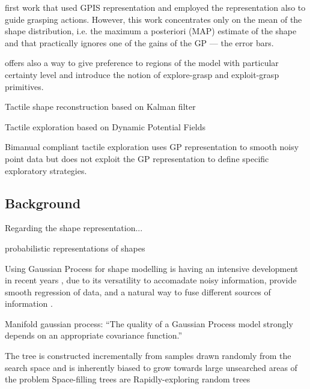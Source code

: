 \cite{Dragiev2011Gaussian} first work that used GPIS representation and employed the representation also to guide grasping actions. However, this work concentrates only on the mean of the shape distribution, i.e. the maximum a posteriori (MAP) estimate of the shape and that practically ignores one of the gains of the GP --- the error bars.

\cite{Dragiev2013Uncertainty} offers also a way to give preference to regions of the model with particular certainty level and introduce the notion of explore-grasp and exploit-grasp primitives.

{\color{red} Tactile shape reconstruction based on Kalman filter}
\citet{Meier2011Probabilistic}

{\color{red} Tactile exploration based on Dynamic Potential Fields}
\citet{Bierbaum2008Potential}

{\color{red} Bimanual compliant tactile exploration}
\citet{Sommer2014Bimanual} uses GP representation to smooth noisy point data but does not exploit the GP representation to define specific exploratory strategies.

\subsection{Background}
\label{sec:background}


Regarding the shape representation...

\citet{Faria2010Probabilistic} probabilistic representations of shapes

Using Gaussian Process for shape modelling is having an intensive development in recent years \citep{Mahler2015Grasp,Rosales2014Active,Bjorkman2013Enhancing,Dragiev2011Gaussian}, due to its versatility to accomadate noisy information, provide smooth regression of data, and a natural way to fuse different sources of information \citep{Rasmussen2006Gaussian}.

Manifold gaussian process: \citet{Calandra2014Manifold} ``The quality of a Gaussian Process model strongly depends on an appropriate covariance function.''

The tree is constructed incrementally from samples drawn randomly from the search space and is inherently biased to grow towards large unsearched areas of the problem
Space-filling trees are
Rapidly-exploring random trees \citet{LaValle2011Motion}

